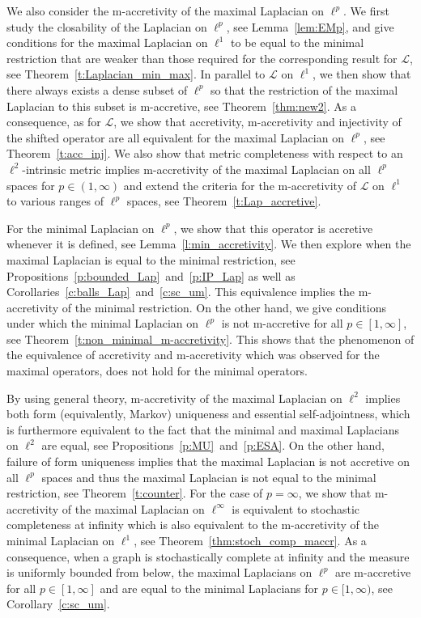 \documentclass[letterpaper]{article}
\theoremstyle{definition}
\theoremstyle{named}
\numberwithin{equation}{section}
\newcommand{\Deltaphi}{\mathcal{L}}
\begin{document}
We also consider the m-accretivity of the maximal Laplacian on $\ell^p$.
We first study the closability of the Laplacian
on $\ell^p$, see Lemma~\ref{lem:EMp}, and give conditions for the maximal
Laplacian on $\ell^1$
to be equal to the minimal restriction that 
are weaker than those required for the corresponding result for $\Deltaphi$,
see Theorem~\ref{t:Laplacian_min_max}.
In parallel to $\Deltaphi$ on $\ell^1$, we then show that there always exists 
a dense subset of $\ell^p$ so that the restriction of the maximal Laplacian to this subset
is m-accretive, see Theorem~\ref{thm:new2}. As a consequence, as for $\Deltaphi$, we show that
accretivity, m-accretivity and injectivity of the shifted operator are all equivalent
for the maximal Laplacian on $\ell^p$, see Theorem~\ref{t:acc_inj}.
We also show that metric completeness with respect to an $\ell^2$-intrinsic metric
implies m-accretivity of the maximal Laplacian on all $\ell^p$ spaces for $p \in (1,\infty)$
and extend the criteria for the m-accretivity of $\Deltaphi$ on $\ell^1$ 
to various ranges of $\ell^p$ spaces, 
see Theorem~\ref{t:Lap_accretive}. 


For the minimal Laplacian on $\ell^p$, we show
that this operator is accretive whenever it is defined,
see Lemma~\ref{l:min_accretivity}.
We then explore when the maximal Laplacian is equal to the minimal restriction, 
see Propositions~\ref{p:bounded_Lap}~and~\ref{p:IP_Lap} as well as 
Corollaries~\ref{c:balls_Lap}~and~\ref{c:sc_um}.
This equivalence implies the m-accretivity of the minimal restriction.
On the other hand, we give conditions under which the minimal Laplacian on $\ell^p$
is not m-accretive for all $p \in [1,\infty]$, see Theorem~\ref{t:non_minimal_m-accretivity}. 
This shows that the phenomenon of the equivalence
of accretivity and m-accretivity which was observed for the maximal operators, does not hold
for the minimal operators.

By using general theory, 
m-accretivity of the maximal Laplacian on $\ell^2$ implies both form (equivalently, Markov) uniqueness
and essential self-adjointness, which is furthermore equivalent to the fact
that the minimal and maximal Laplacians on $\ell^2$ are equal,
see Propositions~\ref{p:MU}~and~\ref{p:ESA}.
On the other hand, failure of form uniqueness
implies that the maximal Laplacian is not accretive on all $\ell^p$
spaces and thus the maximal Laplacian is not equal to the minimal restriction, 
see Theorem~\ref{t:counter}.
For the case of $p=\infty$, we show that m-accretivity of
the maximal Laplacian on $\ell^\infty$ is equivalent to stochastic completeness
at infinity which is also equivalent to the m-accretivity
of the minimal Laplacian on $\ell^1$, see Theorem~\ref{thm:stoch_comp_maccr}. As a consequence,
when a graph is stochastically complete at infinity and the measure
is uniformly bounded from below, the maximal Laplacians on $\ell^p$
are m-accretive for all $p \in [1,\infty]$ and are equal to the minimal
Laplacians for $p \in [1, \infty)$, see Corollary~\ref{c:sc_um}.
\end{document}
